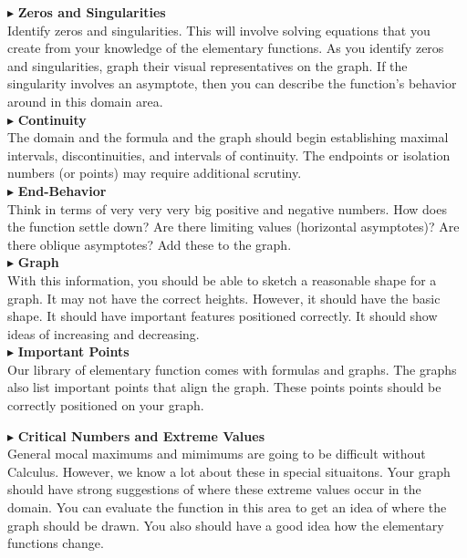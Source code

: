\documentclass{ximera}
\begin{document}
$\blacktriangleright$ \textbf{\textcolor{red!10!blue!90!}{Zeros and Singularities}} \\
Identify zeros and singularities.  This will involve solving equations that you create from your knowledge of the elementary functions. As you identify zeros and singularities, graph their visual representatives on the graph. If the singularity involves an asymptote, then you can describe the function's behavior around in this domain area.\\



$\blacktriangleright$ \textbf{\textcolor{red!10!blue!90!}{Continuity}} \\
The domain and the formula and the graph should begin establishing maximal intervals, discontinuities, and intervals of continuity.  The endpoints or isolation numbers (or points) may require additional scrutiny.  \\


$\blacktriangleright$ \textbf{\textcolor{red!10!blue!90!}{End-Behavior}} \\
Think in terms of very very very big positive and negative numbers.  How does the function settle down?  Are there limiting values (horizontal asymptotes)?  Are there oblique asymptotes? Add these to the graph. \\


$\blacktriangleright$ \textbf{\textcolor{red!10!blue!90!}{Graph}} \\
With this information, you should be able to sketch a reasonable shape for a graph.  It may not have the correct heights. However, it should have the basic shape.  It should have important features positioned correctly. It should show ideas of increasing and decreasing. \\


$\blacktriangleright$ \textbf{\textcolor{red!10!blue!90!}{Important Points}} \\
Our library of elementary function comes with formulas and graphs.  The graphs also list important points that align the graph.  These points points should be correctly positioned on your graph.


$\blacktriangleright$ \textbf{\textcolor{red!10!blue!90!}{Critical Numbers and Extreme Values}} \\
General mocal maximums and mimimums are going to be difficult without Calculus.  However, we know a lot about these in special situaitons. Your graph should have strong suggestions of where these extreme values occur in the domain. You can evaluate the function in this area to get an idea of where the graph should be drawn.  You also should have a good idea how the elementary functions change.
\end{document}
